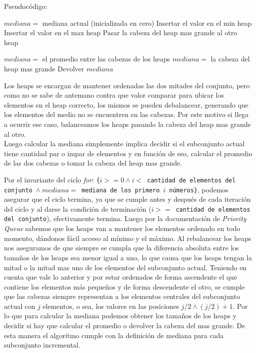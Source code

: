 Pseudocódigo:
\begin{algorithmic}
	\STATE $mediana =$ mediana actual (inicializada en cero)
			\STATE Insertar el valor en el min heap
		\ELSE
			\STATE Insertar el valor en el max heap
		\ENDIF
			\STATE Pasar la cabeza del heap mas grande al otro heap
		\ENDIF

			\STATE $mediana = $ el promedio entre las cabezas de los heaps
		\ELSE
			\STATE $mediana = $ la cabeza del heap mas grande
		\ENDIF
		\STATE Devolver $mediana$
	\ENDFOR
\end{algorithmic}


Los heaps se encargan de mantener ordenadas las dos mitades del conjunto, pero como no se sabe de antemano contra que valor comparar para ubicar los elementos en el heap correcto, los mismos se pueden debalancear, generando que los elementos del medio no se encuentren en las cabezas. Por este motivo si llega a ocurrir ese caso, balanceamos los heaps pasando la cabeza del heap mas grande al otro.\\

Luego calcular la mediana simplemente implica decidir si el subconjunto actual tiene cantidad par o impar de elementos y en función de eso, calcular el promedio de las dos cabezas o tomar la cabeza del heap mas grande.

Por el invariante del ciclo \emph{for}: \texttt{\{$i >= 0 \land i <$ cantidad de elementos del conjunto $\land\ mediana =$ mediana de los primero $i$ números\}}, podemos asegurar que el ciclo termina, ya que se cumple antes y después de cada iteración del ciclo y al darse la condición de terminación (\texttt{$i >=$ cantidad de elementos del conjunto}), efectivamente termina. Luego por la documentación de \emph{Priority Queue} sabemos que los heaps van a mantener los elementos ordenado en todo momento, dándonos fácil acceso al mínimo y el máximo. Al rebalancear los heaps nos aseguramos de que siempre se cumpla que la diferencia absoluta entre los tamaños de los heaps sea menor igual a uno, lo que causa que los heaps tengan la mitad o la mitad mas uno de los elementos del subconjunto actual. Teniendo en cuenta que vale lo anterior y por estar ordenados de forma ascendente el que contiene los elementos más pequeños y de forma descendente el otro, se cumple que las cabezas siempre representan a los elementos centrales del subconjunto actual con $j$ elementos, o sea, los valores en las posiciones $j/2 \land (j/2)+1$. Por lo que para calcular la mediana podemos obtener los tamaños de los heaps y decidir si hay que calcular el promedio o devolver la cabeza del mas grande. De esta manera el algoritmo cumple con la definición de mediana para cada subconjunto incremental.

